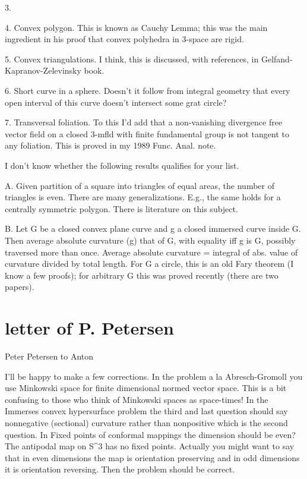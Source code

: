 3.

4. Convex polygon. This is known as Cauchy Lemma; this was the main
ingredient in his proof that convex polyhedra in 3-space are rigid.

5. Convex triangulations. I think, this is discussed, with
references, in Gelfand-Kapranov-Zelevinsky book.

6. Short curve in a sphere. Doesn't it follow from integral geometry
that every open interval of this curve doesn't intersect some grat
circle?

7. Transversal foliation. To this I'd add that a non-vanishing
divergence free vector field on a closed 3-mfld with finite
fundamental group is not tangent to any foliation. This is proved in
my 1989 Func. Anal. note.

I don't know whether the following results qualifies for your list.

A. Given partition of a square into triangles of equal areas, the
number of triangles is even. There are many generalizations. E.g.,
the same holds for a centrally symmetric polygon. There is literature
on this subject.

B. Let G be a closed convex plane curve and g a closed immersed curve
inside G. Then average absolute curvature (g) \geq that of G, with
equality iff g is G, possibly traversed more than once. Average
absolute curvature = integral of abs. value of curvature divided by
total length.
For G a circle, this is an old Fary theorem (I know a few proofs);
for arbitrary G this was proved recently (there are two papers).



\chapter{letter of P. Petersen}

Peter Petersen 	to Anton

I'll be happy to make a few corrections.
In the problem a la Abresch-Gromoll you use Minkowski space for finite
dimensional normed vector space. This is a bit confusing to those who
think of Minkowski spaces as space-times!
In the Immerses convex hypersurface problem the third and last question
should say nonnegative (sectional) curvature rather than nonpositive which
is the second question.
In Fixed points of conformal mappings the dimension should be even? The
antipodal map on S^3 has no fixed points. Actually you might want to say
that in even dimensions the map is orientation preserving and in odd
dimensions it is orientation reversing. 
Then the problem should be correct.

